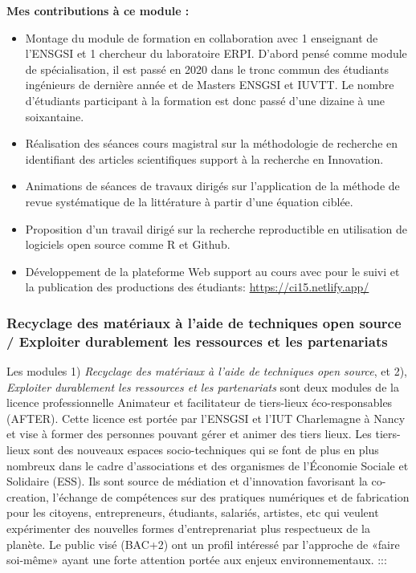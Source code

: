 \documentclass[
  11pt,
]{article}
\providecommand{\tightlist}{%
  \setlength{\itemsep}{0pt}\setlength{\parskip}{0pt}}\usepackage{longtable,booktabs,array}
\begin{document}
\textbf{Mes contributions à ce module :}

\begin{itemize}
\tightlist
\item
  Montage du module de formation en collaboration avec 1 enseignant de
  l'ENSGSI et 1 chercheur du laboratoire ERPI. D'abord pensé comme
  module de spécialisation, il est passé en 2020 dans le tronc commun
  des étudiants ingénieurs de dernière année et de Masters ENSGSI et
  IUVTT. Le nombre d'étudiants participant à la formation est donc passé
  d'une dizaine à une soixantaine.
\item
  Réalisation des séances cours magistral sur la méthodologie de
  recherche en identifiant des articles scientifiques support à la
  recherche en Innovation.
\item
  Animations de séances de travaux dirigés sur l'application de la
  méthode de revue systématique de la littérature à partir d'une
  équation ciblée.
\item
  Proposition d'un travail dirigé sur la recherche reproductible en
  utilisation de logiciels open source comme R et Github.
\item
  Développement de la plateforme Web support au cours avec pour le suivi
  et la publication des productions des étudiants:
  \url{https://ci15.netlify.app/}
\end{itemize}

\hypertarget{recyclage-des-matuxe9riaux-uxe0-laide-de-techniques-open-source-exploiter-durablement-les-ressources-et-les-partenariats}{%
\subsubsection{Recyclage des matériaux à l'aide de techniques open
source / Exploiter durablement les ressources et les
partenariats}\label{recyclage-des-matuxe9riaux-uxe0-laide-de-techniques-open-source-exploiter-durablement-les-ressources-et-les-partenariats}}

Les modules 1) \emph{Recyclage des matériaux à l'aide de techniques open
source}, et 2), \emph{Exploiter durablement les ressources et les
partenariats} sont deux modules de la licence professionnelle Animateur
et facilitateur de tiers-lieux éco-responsables (AFTER). Cette licence
est portée par l'ENSGSI et l'IUT Charlemagne à Nancy et vise à former
des personnes pouvant gérer et animer des tiers lieux. Les tiers-lieux
sont des nouveaux espaces socio-techniques qui se font de plus en plus
nombreux dans le cadre d'associations et des organismes de l'Économie
Sociale et Solidaire (ESS). Ils sont source de médiation et d'innovation
favorisant la co-creation, l'échange de compétences sur des pratiques
numériques et de fabrication pour les citoyens, entrepreneurs,
étudiants, salariés, artistes, etc qui veulent expérimenter des
nouvelles formes d'entreprenariat plus respectueux de la planète. Le
public visé (BAC+2) ont un profil intéressé par l'approche de «faire
soi-même» ayant une forte attention portée aux enjeux environnementaux.
:::
\end{document}
